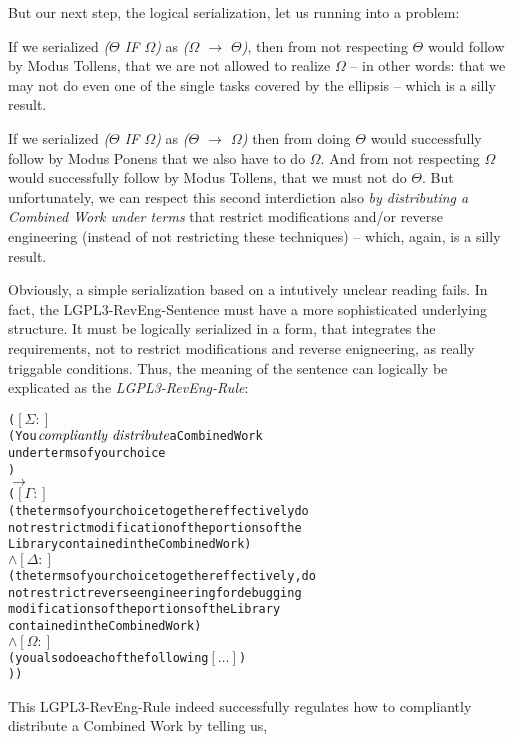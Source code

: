 But our next step, the logical serialization, let us running into a problem:

If we serialized \emph{($\Theta$ IF $\Omega$)} as \emph{($\Omega$ $\rightarrow$
$\Theta$)}, then from not respecting $\Theta$ would follow by Modus Tollens,
that we are not allowed to realize $\Omega$ -- in other words:
that we may not do even one of the single tasks covered by the ellipsis -- which
is a silly result. 

If we serialized \emph{($\Theta$ IF $\Omega$)} as \emph{($\Theta$ $\rightarrow$
$\Omega$)} then from doing $\Theta$ would successfully follow by Modus Ponens
that we also have to do $\Omega$. And from not respecting $\Omega$ would
successfully follow by Modus Tollens, that we must not do $\Theta$. But
unfortunately, we can respect this second interdiction also \emph{by
distributing a Combined Work under terms} that restrict modifications and/or
reverse engineering (instead of not restricting these techniques) -- which,
again, is a silly result.

Obviously, a simple serialization based on a intutively unclear reading fails.
In fact, the LGPL3-RevEng-Sentence must have a more sophisticated underlying
structure. It must be logically serialized in a form, that integrates the
requirements, not to restrict modifications and reverse enigneering, as really
triggable conditions. Thus, the meaning of the sentence can logically be
explicated as the \emph{LGPL3-RevEng-Rule}:

\begin{alltt}
( \([\Sigma:]\)
  ( You \(\emph{compliantly distribute}\) a Combined Work 
    under terms of your choice 
  ) 
  \(\rightarrow\)  
  (    \([\Gamma:]\)
     ( the terms of your choice together effectively do 
       not restrict modification of the portions of the 
       Library contained in the Combined Work) 
     \(\wedge\) \([\Delta:]\)
     ( the terms of your choice together effectively, do 
       not restrict reverse engineering for debugging 
       modifications of the portions of the Library 
       contained in the Combined Work)
     \(\wedge\) \([\Omega:]\) 
     ( you also do each of the following \([\ldots]\))
) )
\end{alltt}  

This LGPL3-RevEng-Rule indeed successfully regulates how to compliantly
distribute a Combined Work by telling us,

